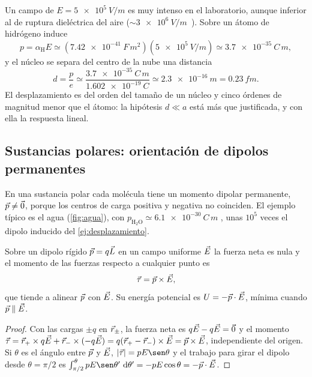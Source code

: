 \begin{ejemplo}\label{ej:desplazamiento}
Un campo de $E=\SI{5e5}{V/m}$ es muy intenso en el laboratorio, aunque inferior al de ruptura dieléctrica del
aire ($\sim\SI{3e6}{V/m}$~\cite{T3}). Sobre un átomo de hidrógeno induce
\[
  p=\alpha_{\mathrm H}E\simeq(\SI{7.42e-41}{F\,m^2})(\SI{5e5}{V/m})\simeq\SI{3.7e-35}{C\,m},
\]
y el núcleo se separa del centro de la nube una distancia
\[
  d=\frac{p}{e}\simeq\frac{\SI{3.7e-35}{C\,m}}{\SI{1.602e-19}{C}}\simeq\SI{2.3e-16}{m}=\SI{0.23}{fm}.
\]
El desplazamiento es del orden del tamaño de un núcleo y cinco órdenes de magnitud menor que el átomo: la
hipótesis $d\ll a$ está más que justificada, y con ella la respuesta lineal.
\end{ejemplo}

\subsection{Sustancias polares: orientación de dipolos permanentes}\label{sec:polares}

En una sustancia polar cada molécula tiene un momento dipolar permanente, $\vec p\neq\vec 0$, porque los
centros de carga positiva y negativa no coinciden. El ejemplo típico es el agua
(\cref{fig:agua}), con $p_{\mathrm{H_2O}}\simeq\SI{6.1e-30}{C\,m}$ \cite{Griffiths}, unas $10^5$ veces el
dipolo inducido del \cref{ej:desplazamiento}.



\begin{proposicion}\label{prop:par}
Sobre un dipolo rígido $\vec p=q\vec L$ en un campo uniforme $\vec E$ la fuerza neta es nula y el momento de las
fuerzas respecto a cualquier punto es
\begin{equation}\label{eq:par}
  \vec\tau=\vec p\times\vec E ,
\end{equation}
que tiende a alinear $\vec p$ con $\vec E$. Su energía potencial es $U=-\vec p\cdot\vec E$, mínima cuando $\vec p\parallel\vec E$.
\end{proposicion}

\begin{proof}
Con las cargas $\pm q$ en $\vec r_\pm$, la fuerza neta es $q\vec E-q\vec E=\vec 0$ y el momento
$\vec\tau=\vec r_+\times q\vec E+\vec r_-\times(-q\vec E)=q(\vec r_+-\vec r_-)\times\vec E=\vec p\times\vec E$, independiente del origen.
Si $\theta$ es el ángulo entre $\vec p$ y $\vec E$, $\abs{\vtau}=pE\sen\theta$ y el trabajo para girar el dipolo desde
$\theta=\pi/2$ es $\int_{\pi/2}^{\theta}pE\sen\theta'\,\dd\theta'=-pE\cos\theta=-\vp\cdot\vE$.
\end{proof}

